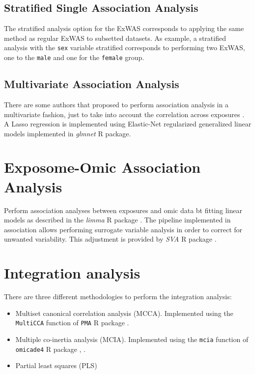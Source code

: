 \documentclass[
]{book}
\providecommand{\tightlist}{%
  \setlength{\itemsep}{0pt}\setlength{\parskip}{0pt}}
\begin{document}
\hypertarget{stratified-single-association-analysis}{%
\subsection{Stratified Single Association Analysis}\label{stratified-single-association-analysis}}

The stratified analysis option for the ExWAS corresponds to applying the same method as regular ExWAS to subsetted datasets. As example, a stratified analysis with the \texttt{sex} variable stratified corresponds to performing two ExWAS, one to the \texttt{male} and one for the \texttt{female} group.

\hypertarget{multivariate-association-analysis}{%
\subsection{Multivariate Association Analysis}\label{multivariate-association-analysis}}

There are some authors that proposed to perform association analysis in a multivariate fashion, just to take into account the correlation across exposures \citet{agier2016systematic} . A Lasso regression is implemented using Elastic-Net regularized generalized linear models implemented in \emph{glmnet} R package.

\hypertarget{exposome-omic-association-analysis}{%
\section{Exposome-Omic Association Analysis}\label{exposome-omic-association-analysis}}

Perform association analyses between exposures and omic data bt fitting linear models as described in the \emph{limma} R package \citet{ritchie2015limma} . The pipeline implemented in association allows performing surrogate variable analysis in order to correct for unwanted variability. This adjustment is provided by \emph{SVA} R package \citet{sva} .

\hypertarget{integration-analysis}{%
\section{Integration analysis}\label{integration-analysis}}

There are three different methodologies to perform the integration analysis:

\begin{itemize}
\tightlist
\item
  Multiset canonical correlation analysis (MCCA). Implemented using the \texttt{MultiCCA} function of \texttt{PMA} R package \citet{witten2020package} .
\item
  Multiple co-inertia analysis (MCIA). Implemented using the \texttt{mcia} function of \texttt{omicade4} R package \citet{mcia} , \citet{min2020sparse} .
\item
  Partial least squares (PLS)
\end{itemize}
\end{document}
